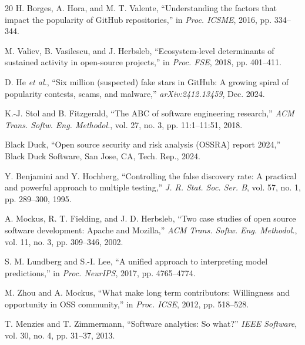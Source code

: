 \documentclass[conference]{IEEEtran}
\begin{document}
\begin{thebibliography}{20}
 H. Borges, A. Hora, and M. T. Valente, ``Understanding the factors that impact the popularity of GitHub repositories,'' in \textit{Proc. ICSME}, 2016, pp. 334--344.

 M. Valiev, B. Vasilescu, and J. Herbsleb, ``Ecosystem-level determinants of sustained activity in open-source projects,'' in \textit{Proc. FSE}, 2018, pp. 401--411.

 D. He \textit{et al.}, ``Six million (suspected) fake stars in GitHub: A growing spiral of popularity contests, scams, and malware,'' \textit{arXiv:2412.13459}, Dec. 2024.

 K.-J. Stol and B. Fitzgerald, ``The ABC of software engineering research,'' \textit{ACM Trans. Softw. Eng. Methodol.}, vol. 27, no. 3, pp. 11:1--11:51, 2018.

 Black Duck, ``Open source security and risk analysis (OSSRA) report 2024,'' Black Duck Software, San Jose, CA, Tech. Rep., 2024.

 Y. Benjamini and Y. Hochberg, ``Controlling the false discovery rate: A practical and powerful approach to multiple testing,'' \textit{J. R. Stat. Soc. Ser. B}, vol. 57, no. 1, pp. 289--300, 1995.

 A. Mockus, R. T. Fielding, and J. D. Herbsleb, ``Two case studies of open source software development: Apache and Mozilla,'' \textit{ACM Trans. Softw. Eng. Methodol.}, vol. 11, no. 3, pp. 309--346, 2002.

 S. M. Lundberg and S.-I. Lee, ``A unified approach to interpreting model predictions,'' in \textit{Proc. NeurIPS}, 2017, pp. 4765--4774.

 M. Zhou and A. Mockus, ``What make long term contributors: Willingness and opportunity in OSS community,'' in \textit{Proc. ICSE}, 2012, pp. 518--528.

 T. Menzies and T. Zimmermann, ``Software analytics: So what?'' \textit{IEEE Software}, vol. 30, no. 4, pp. 31--37, 2013.

\end{thebibliography}
\end{document}
